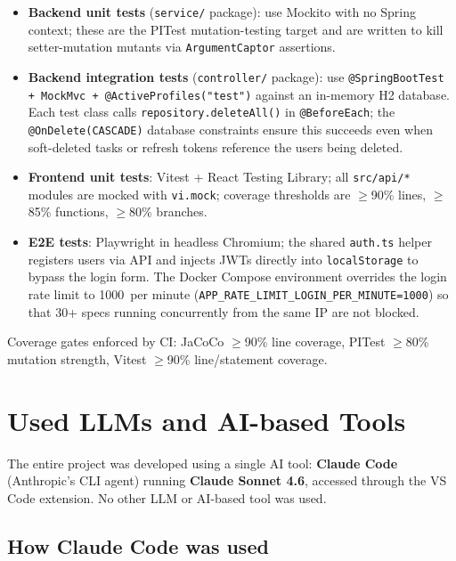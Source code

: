 \documentclass[a4paper, 12pt]{article}
\begin{document}
\begin{itemize}
  \item \textbf{Backend unit tests} (\texttt{service/} package): use Mockito with no Spring
        context; these are the PITest mutation-testing target and are written to kill
        setter-mutation mutants via \texttt{ArgumentCaptor} assertions.
  \item \textbf{Backend integration tests} (\texttt{controller/} package): use
        \texttt{@SpringBootTest + MockMvc + @ActiveProfiles("test")} against an in-memory H2
        database. Each test class calls \texttt{repository.deleteAll()} in
        \texttt{@BeforeEach}; the \texttt{@OnDelete(CASCADE)} database constraints ensure
        this succeeds even when soft-deleted tasks or refresh tokens reference the users being
        deleted.
  \item \textbf{Frontend unit tests}: Vitest + React Testing Library; all \texttt{src/api/*}
        modules are mocked with \texttt{vi.mock}; coverage thresholds are $\geq$90\% lines,
        $\geq$85\% functions, $\geq$80\% branches.
  \item \textbf{E2E tests}: Playwright in headless Chromium; the shared \texttt{auth.ts}
        helper registers users via API and injects JWTs directly into \texttt{localStorage}
        to bypass the login form. The Docker Compose environment overrides the login rate
        limit to 1000~per minute (\texttt{APP\_RATE\_LIMIT\_LOGIN\_PER\_MINUTE=1000}) so that
        30+ specs running concurrently from the same IP are not blocked.
\end{itemize}

Coverage gates enforced by CI: JaCoCo $\geq$90\% line coverage, PITest $\geq$80\% mutation
strength, Vitest $\geq$90\% line/statement coverage.

\section{Used LLMs and AI-based Tools}

The entire project was developed using a single AI tool: \textbf{Claude Code} (Anthropic's
CLI agent) running \textbf{Claude Sonnet 4.6}, accessed through the VS Code extension. No
other LLM or AI-based tool was used.

\subsection{How Claude Code was used}
\end{document}
